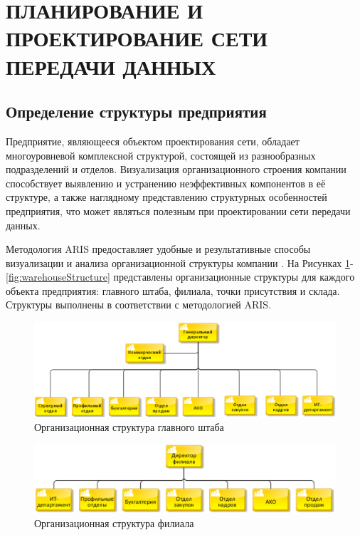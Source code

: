 \documentclass[14pt, a4paper]{extarticle}
\numberwithin{equation}{section}
\begin{document}
\section{ПЛАНИРОВАНИЕ И ПРОЕКТИРОВАНИЕ СЕТИ ПЕРЕДАЧИ ДАННЫХ}

\subsection{Определение структуры предприятия}
Предприятие, являющееся объектом проектирования сети, обладает многоуровневой 
комплексной структурой, состоящей из разнообразных подразделений и отделов. 
Визуализация организационного строения компании способствует выявлению и устранению
неэффективных компонентов в её структуре, а также наглядному представлению структурных
особенностей предприятия, что может являться полезным при проектировании сети передачи
данных.


Методология ARIS предоставляет удобные и результативные 
способы визуализации и анализа организационной структуры компании \cite{davis2007aris}. На Рисунках 
\ref{fig:mainDepartamentStructure}-\ref{fig:warehouseStructure} представлены
организационные структуры для каждого объекта предприятия: главного штаба, филиала, точки присутствия и склада. Структуры выполнены в соответствии с методологией ARIS.

\begin{figure}[H]
        \centering
        \includegraphics[scale=0.6]{ARIS_mainDepStructure.png}
        \caption{Организационная структура главного штаба}
        \label{fig:mainDepartamentStructure}
\end{figure}

\begin{figure}[H]
        \centering
        \includegraphics[scale=0.6]{ARIS_filialStructure.png}
        \caption{Организационная структура филиала}
        \label{fig:filialStructure}
\end{figure}
\end{document}
